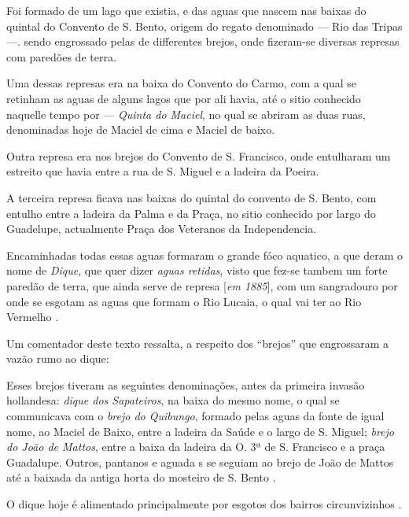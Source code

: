 \begin{citacao}
Foi formado de um lago que existia, e das aguas que nascem nas baixas do quintal do Convento de S. Bento, origem do regato denominado --- Rio das Tripas ---. sendo engrossado pelas de differentes brejos, onde fizeram-se diversas represas com paredões de terra.

Uma dessas represas era na baixa do Convento do Carmo, com a qual se retinham as aguas de alguns lagos que por ali havia, até o sitio conhecido naquelle tempo por --- \textit{Quinta do Maciel}, no qual se abriram as duas ruas, denominadas hoje de Maciel de cima e Maciel de baixo.

Outra represa era nos brejos do Convento de S. Francisco, onde entulharam um estreito que havia entre a rua de S. Miguel e a ladeira da Poeira.

A terceira represa ficava nas baixas do quintal do convento de S. Bento, com entulho entre a ladeira da Palma e da Praça, no sitio conhecido por largo do Guadelupe, actualmente Praça dos Veteranos da Independencia.

Encaminhadas todas essas aguas formaram o grande fóco aquatico, a que deram o nome de \textit{Dique}, que quer dizer \textit{aguas retidas}, visto que fez-se tambem um forte paredão de terra, que ainda serve de represa [\textit{em 1885}], com um sangradouro por onde se esgotam as aguas que formam o Rio Lucaia, o qual vai ter ao Rio Vermelho \cite[pp.~393-394]{amaral_resumo_2013}. 
\end{citacao}

Um comentador deste texto ressalta, a respeito dos ``brejos'' que engrossaram a vazão rumo ao dique:

\begin{citacao}
Esses brejos tiveram as seguintes denominações, antes da primeira invasão hollandesa: \textit{dique dos Sapateiros}, na baixa do mesmo nome, o qual se communicava com o \textit{brejo do Quibungo}, formado pelas aguas da fonte de igual nome, ao Maciel de Baixo, entre a ladeira da Saúde e o largo de S. Miguel; \textit{brejo do João de Mattos}, entre a baixa da ladeira da O. 3ª de S. Francisco e a praça Guadalupe. Outros, pantanos e aguada s se seguiam ao brejo de João de Mattos até a baixada da antiga horta do mosteiro de S. Bento \cite[pp.~393-394]{amaral_resumo_2013}.
\end{citacao}

O dique hoje é alimentado principalmente por esgotos dos bairros circunvizinhos \cite[p.~41]{santos_aguas_2010}.

